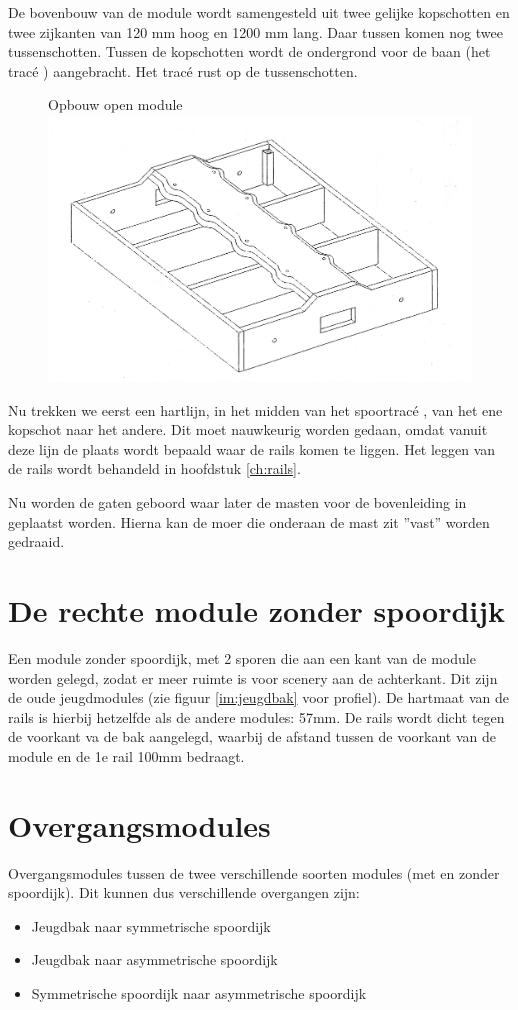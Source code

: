 \documentclass[12pt,a4paper]{report}
\newcommand*{\trace}{trac\'{e} }
\begin{document}
De bovenbouw van de module wordt samengesteld uit twee gelijke kopschotten en twee zijkanten van 120 mm hoog en 1200 mm lang. Daar tussen komen nog twee tussenschotten.
Tussen de kopschotten wordt de ondergrond voor de baan (het \trace) aangebracht. Het \trace rust op de tussenschotten. 

\begin{figure}[!ht]
  \captionbox
  {Opbouw open module\label{figuur1}}
  {\includegraphics[scale=0.5]{images/rcu_figuur1}}
\end{figure}

Nu trekken we eerst een hartlijn, in het midden van het spoor\trace, van het ene kopschot naar het andere. Dit moet nauwkeurig worden gedaan, omdat vanuit deze lijn de plaats wordt bepaald waar de rails komen te liggen.
Het leggen van de rails wordt behandeld in hoofdstuk \ref{ch:rails}.

Nu worden de gaten geboord waar later de masten voor de bovenleiding in geplaatst worden. 
Hierna kan de moer die onderaan de mast zit ''vast'' worden gedraaid.

\section{De rechte module zonder spoordijk}
Een module zonder spoordijk, met 2 sporen die aan een kant van de module worden gelegd, zodat er meer ruimte is voor scenery aan de achterkant. Dit zijn de oude jeugdmodules (zie figuur \ref{im:jeugdbak} voor profiel).
De hartmaat van de rails is hierbij hetzelfde als de andere modules: 57mm. De rails wordt dicht tegen de voorkant va de bak aangelegd, waarbij de afstand tussen de voorkant van de module en de 1e rail 100mm bedraagt.

\section{Overgangsmodules}
Overgangsmodules tussen de twee verschillende soorten modules (met en zonder spoordijk). Dit kunnen dus verschillende overgangen zijn:
\begin{itemize}
\item Jeugdbak naar symmetrische spoordijk
\item Jeugdbak naar asymmetrische spoordijk
\item Symmetrische spoordijk naar asymmetrische spoordijk
\end{itemize}
\end{document}

